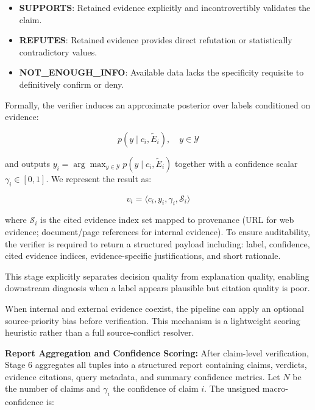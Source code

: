 \documentclass[sn-mathphys, oneside]{sn-jnl}
\begin{document}
\begin{itemize}
    \item \textbf{SUPPORTS}: Retained evidence explicitly and incontrovertibly validates the claim.
    \item \textbf{REFUTES}: Retained evidence provides direct refutation or statistically contradictory values.
    \item \textbf{NOT\_ENOUGH\_INFO}: Available data lacks the specificity requisite to definitively confirm or deny.
\end{itemize}

Formally, the verifier induces an approximate posterior over labels conditioned on evidence:

\begin{equation}
p(y \mid c_i, \widetilde{E}_i), \quad y \in \mathcal{Y}
\label{eq:label_posterior}
\end{equation}

and outputs $y_i = \arg\max_{y \in \mathcal{Y}} p(y\mid c_i,\widetilde{E}_i)$ together with a confidence scalar $\gamma_i \in [0,1]$. We represent the result as:

\begin{equation}
    v_i = \langle c_i, y_i, \gamma_i, \mathcal{S}_i \rangle
    \label{eq:verdict_tuple}
\end{equation}

where $\mathcal{S}_i$ is the cited evidence index set mapped to provenance (URL for web evidence; document/page references for internal evidence). To ensure auditability, the verifier is required to return a structured payload including: label, confidence, cited evidence indices, evidence-specific justifications, and short rationale.

This stage explicitly separates decision quality from explanation quality, enabling downstream diagnosis when a label appears plausible but citation quality is poor.

When internal and external evidence coexist, the pipeline can apply an optional source-priority bias before verification. This mechanism is a lightweight scoring heuristic rather than a full source-conflict resolver.

\textbf{Report Aggregation and Confidence Scoring:} After claim-level verification, Stage 6 aggregates all tuples into a structured report containing claims, verdicts, evidence citations, query metadata, and summary confidence metrics. Let $N$ be the number of claims and $\gamma_i$ the confidence of claim $i$. The unsigned macro-confidence is:
\end{document}
